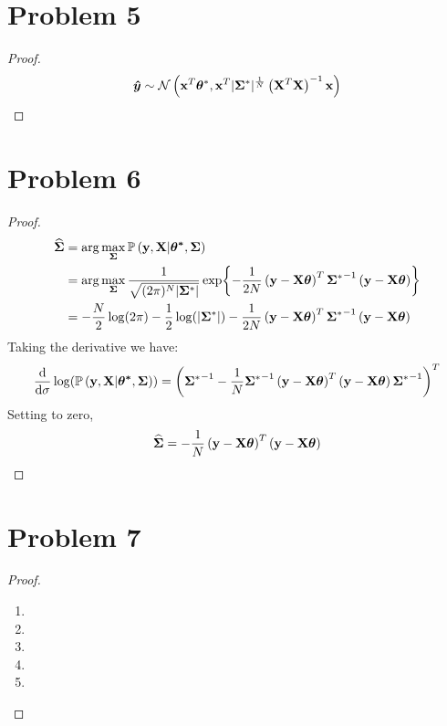 \documentclass{article}
\begin{document}
\section*{Problem 5}
    \begin{proof}
        $$\vb*{\hat{y}} \sim \mathcal{N}\left(\vb{x}^T \bm{\theta}^*,\vb{x}^T |\bm{\Sigma}^*|^{\frac{1}{N}}\left(\vb{X}^T\vb{X}\right)^{-1} \vb{x} \right)$$
    \end{proof}

\section*{Problem 6}
    \begin{proof}
    \begin{align*}
        \bm{\widehat{\Sigma}}
        &=\arg{\max_{\bm{\Sigma}} \mathbb{P}\left(\vb{y},\vb{X}|\bm{\theta^*}, \bm{\Sigma}\right) }\\
        &=\arg{\max_{\bm{\Sigma}} \frac{1}{\sqrt{(2\pi)^N |\bm{\Sigma}^*|}}\exp{-\frac{1}{2N}\left(\vb{y}-\vb{X}\bm{\theta}\right)^T{\bm{\Sigma}^*}^{-1}\left(\vb{y}-\vb{X}\bm{\theta}\right)} }\\
        &=-\frac{N}{2}\log(2\pi)-\frac{1}{2}\log(|\bm{\Sigma}^*|)-\frac{1}{2N}\left(\vb{y}-\vb{X}\bm{\theta}\right)^T{\bm{\Sigma}^*}^{-1}\left(\vb{y}-\vb{X}\bm{\theta}\right)
    \end{align*}
    Taking the derivative we have:
    $$\frac{\text{d}}{\text{d}\sigma}\log(\mathbb{P}\left(\vb{y},\vb{X}|\bm{\theta^*}, \bm{\Sigma}\right))
    =\left({\bm{\Sigma}^*}^{-1}-\frac{1}{N}{\bm{\Sigma}^*}^{-1}\left(\vb{y}-\vb{X}\bm{\theta}\right)^T\left(\vb{y}-\vb{X}\bm{\theta}\right){\bm{\Sigma}^*}^{-1}\right)^T$$
    Setting to zero,
    $$\bm{\widehat{\Sigma}}=-\frac{1}{N}\left(\vb{y}-\vb{X}\bm{\theta}\right)^T\left(\vb{y}-\vb{X}\bm{\theta}\right)$$
    \end{proof}

\section*{Problem 7}
    \begin{proof}
        \indent
        \begin{enumerate}[label=(\alph*)]
            \item
            \item
            \item
            \item
            \item
        \end{enumerate}
    \end{proof}
\end{document}

